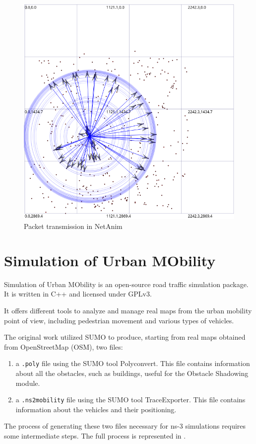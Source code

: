 	\begin{figure}[H]
		\centering
		\includegraphics[scale=0.38]{immagini/netanim}
		\caption{Packet transmission in NetAnim}
		\label{fig:netanim}
	\end{figure}
	
	\section{Simulation of Urban MObility}
	Simulation of Urban MObility is an open-source road traffic simulation package. It is written in C++ and licensed under GPLv3. 
	
	
	It offers different tools to analyze and manage real maps from the urban mobility point of view, including pedestrian movement and various types of vehicles.
	
	
	The original work \cite{ROM2017} utilized SUMO to produce, starting from real maps obtained from OpenStreetMap (OSM), two files:
	\begin{enumerate}
		\item a \texttt{.poly} file using the SUMO tool Polyconvert. This file contains information about all the obstacles, such as buildings, useful for the Obstacle Shadowing module.
		\item a \texttt{.ns2mobility} file using the SUMO tool TraceExporter. This file contains information about the vehicles and their positioning. 
	\end{enumerate}
	The process of generating these two files necessary for ns-3 simulations requires some intermediate steps. The full process is represented in . 
	
